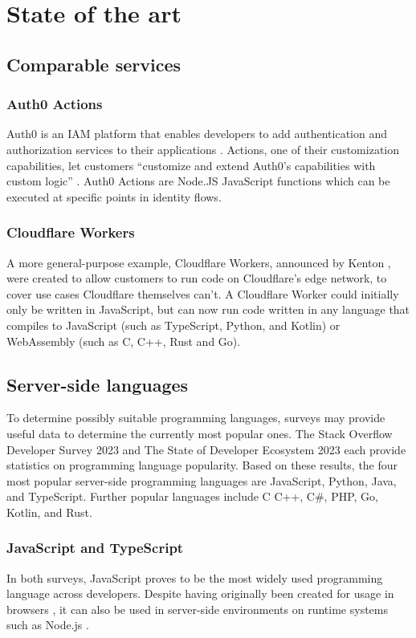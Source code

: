 \section{State of the art}%
\label{sec:state-of-the-art}

\subsection{Comparable services}
\subsubsection{Auth0 Actions}
Auth0 is an IAM platform that enables developers to add authentication and authorization services to their applications \autocite{Auth0Overview}. Actions, one of their customization capabilities, let customers ``customize and extend Auth0's capabilities with custom logic'' \autocite{Auth0Actions}. Auth0 Actions are Node.JS JavaScript functions which can be executed at specific points in identity flows.

\subsubsection{Cloudflare Workers}
A more general-purpose example, Cloudflare Workers, announced by Kenton \textcite{Varda2017}, were created to allow customers to run code on Cloudflare's edge network, to cover use cases Cloudflare themselves can't. A Cloudflare Worker could initially only be written in JavaScript, but can now run code written in any language that compiles to JavaScript (such as TypeScript, Python, and Kotlin) or WebAssembly (such as C, C++, Rust and Go). \autocite{Varda2018, Koeninger2020}

\subsection{Server-side languages}
To determine possibly suitable programming languages, surveys may provide useful data to determine the currently most popular ones. The Stack Overflow Developer Survey 2023 \autocite{StackOverflow2023} and The State of Developer Ecosystem 2023 \autocite{JetBrains2023} each provide statistics on programming language popularity. Based on these results, the four most popular server-side programming languages are JavaScript, Python, Java, and TypeScript. Further popular languages include   C C++, C\#, PHP, Go, Kotlin, and Rust.

\subsubsection{JavaScript and TypeScript}
In both surveys, JavaScript proves to be the most widely used programming language across developers. Despite having originally been created for usage in browsers \autocite{NCC1995}, it can also be used in server-side environments on runtime systems such as Node.js \autocite{OpenJSFoundation}.

